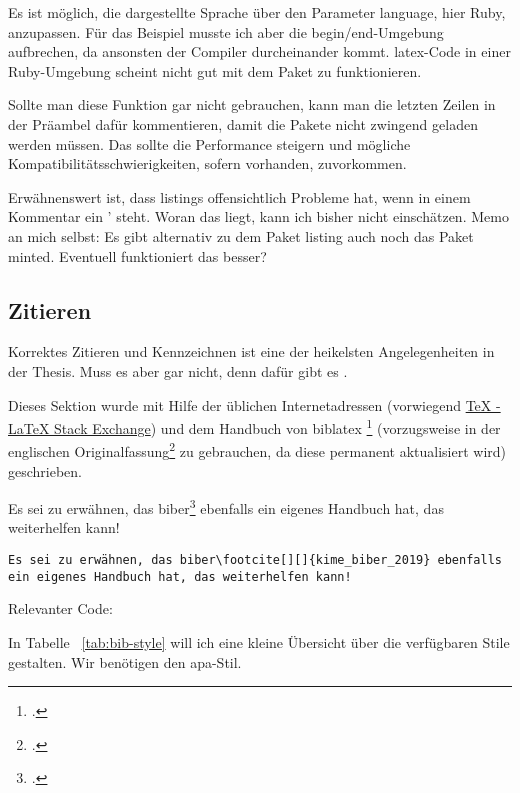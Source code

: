 Es ist möglich, die dargestellte Sprache über den Parameter language, hier Ruby, anzupassen. Für das Beispiel musste ich aber die begin/end-Umgebung aufbrechen, da ansonsten der Compiler durcheinander kommt. \gls{latex}-Code in einer Ruby-Umgebung scheint nicht gut mit dem Paket zu funktionieren.

Sollte man diese Funktion gar nicht gebrauchen, kann man die letzten Zeilen in der Präambel dafür kommentieren, damit die Pakete nicht zwingend geladen werden müssen. Das sollte die Performance steigern und mögliche Kompatibilitätsschwierigkeiten, sofern vorhanden, zuvorkommen.

Erwähnenswert ist, dass listings offensichtlich Probleme hat, wenn in einem Kommentar ein ' steht. Woran das liegt, kann ich bisher nicht einschätzen. Memo an mich selbst: Es gibt alternativ zu dem Paket listing auch noch das Paket minted. Eventuell funktioniert das besser?
\subsection{Zitieren}%
Korrektes Zitieren und Kennzeichnen ist eine der heikelsten Angelegenheiten in der Thesis. Muss es aber gar nicht, denn dafür gibt es .

Dieses Sektion wurde mit Hilfe der üblichen Internetadressen (vorwiegend \href{https://tex.stackexchange.com/}{TeX - LaTeX Stack Exchange}) und dem Handbuch von biblatex \footcite{lehman_biblatex_2017} (vorzugsweise in der englischen Originalfassung\footcite{kime_biblatex_2019} zu gebrauchen, da diese permanent aktualisiert wird) geschrieben.

Es sei zu erwähnen, das biber\footcite[][]{kime_biber_2019} ebenfalls ein eigenes Handbuch hat, das weiterhelfen kann!

\begin{lstlisting}[float=htb,caption=Das Setzen von Zitaten in \protect\LaTeX{},label=lst:cites]
Es sei zu erwähnen, das biber\footcite[][]{kime_biber_2019} ebenfalls ein eigenes Handbuch hat, das weiterhelfen kann!
\end{lstlisting}
Relevanter Code:


In Tabelle ~\ref{tab:bib-style} will ich eine kleine Übersicht über die verfügbaren Stile gestalten. Wir benötigen den \gls{apa}-Stil.

